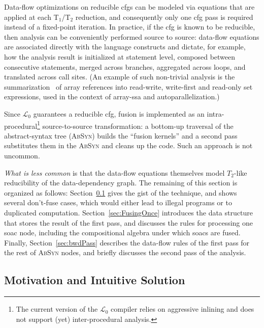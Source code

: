 \documentclass{sigplanconf}  %
\newcommand{\LO}{$\mathcal{L}_0$}
\begin{document}
Data-flow optimizations on reducible {\sc cfg}s can be modeled via equations 
that are applied at each T$_1$/T$_2$ reduction, and consequently only one
{\sc cfg} pass is required instead of a fixed-point iteration.
%
In practice, if the {\sc cfg} is known to be reducible, then 
analysis can be conveniently performed source to source: 
data-flow equations are associated directly with the
language constructs and dictate, for example, how the analysis result is
initialized at statement level, composed between consecutive statements,
merged across branches, aggregated across loops, and translated across 
call sites.  (An example of such non-trivial 
analysis is the summarization~\cite{HybAn} of array references into 
read-write, write-first and read-only set expressions, used in the context 
of array-{\sc ssa} and autoparallelization.)
 
Since \LO{} guarantees a reducible {\sc cfg}, %
fusion is implemented as an intra-procedural\footnote{
The current version of the \LO{} compiler 
relies on aggressive inlining and does not support
(yet) inter-procedural analysis.
}
source-to-source transformation: a bottom-up traversal of the 
abstract-syntax tree (\textsc{AbSyn}) builds the ``fusion kernels'' 
and a second pass substitutes them in the \textsc{AbSyn} and 
cleans up the code.    Such an approach is not uncommon. 

{\em What is less common} is that the data-flow equations 
themselves model $T_2$-like reducibility of the data-dependency graph.
The remaining of this section is organized as follows:
Section~\ref{sec:Intuition} gives the gist of the technique,
and shows several don't-fuse cases, which would
either lead to illegal programs or to duplicated computation.
%
Section~\ref{sec:FusingOnce} introduces the data structure
that stores the result of the first pass, and discusses the rules 
for processing one {\sc soac} node, including the compositional
algebra under which {\sc soac}s are fused. 
Finally, Section~\ref{sec:bwdPass} describes the data-flow rules of
the first pass for the rest of \textsc{AbSyn} nodes, and briefly 
discusses the second pass of the analysis.

\subsection{Motivation and Intuitive Solution}
\label{sec:Intuition}
\end{document}
